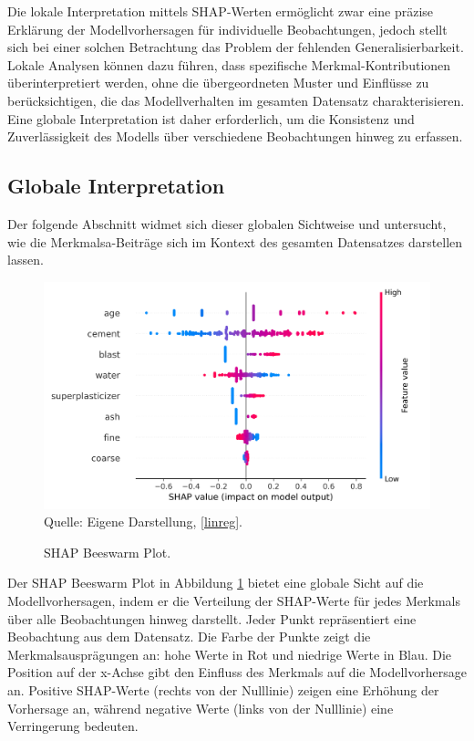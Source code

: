 Die lokale Interpretation mittels SHAP-Werten ermöglicht zwar eine präzise Erklärung 
der Modellvorhersagen für individuelle Beobachtungen, jedoch stellt sich bei einer 
solchen Betrachtung das Problem der fehlenden Generalisierbarkeit. 
Lokale Analysen können dazu führen, dass spezifische Merkmal-Kontributionen überinterpretiert werden, 
ohne die übergeordneten Muster und Einflüsse zu berücksichtigen, 
die das Modellverhalten im gesamten Datensatz charakterisieren. 
Eine globale Interpretation ist daher erforderlich, um die Konsistenz und Zuverlässigkeit 
des Modells über verschiedene Beobachtungen hinweg zu erfassen. 

\subsection{Globale Interpretation}

Der folgende Abschnitt widmet sich dieser globalen Sichtweise und untersucht, 
wie die Merkmalsa-Beiträge sich im Kontext des gesamten Datensatzes darstellen lassen.

\begin{figure}[!h]
    \caption{SHAP Beeswarm Plot.}
    \includegraphics[width=1\textwidth]{../scripts/images/shap_beeswarm_plot.png}
    Quelle: Eigene Darstellung, \ref{linreg}.
    \label{pic:shap_beeswarm}
\end{figure}

Der SHAP Beeswarm Plot in Abbildung \ref{pic:shap_beeswarm} bietet eine globale 
Sicht auf die Modellvorhersagen, indem er die Verteilung der SHAP-Werte für jedes Merkmals 
über alle Beobachtungen hinweg darstellt. Jeder Punkt repräsentiert eine Beobachtung aus dem Datensatz.
Die Farbe der Punkte zeigt die Merkmalsausprägungen an: hohe Werte in Rot und niedrige Werte in Blau. 
Die Position auf der x-Achse gibt den Einfluss des Merkmals auf die Modellvorhersage an. 
Positive SHAP-Werte (rechts von der Nulllinie) zeigen eine Erhöhung der Vorhersage an, 
während negative Werte (links von der Nulllinie) eine Verringerung bedeuten. 

